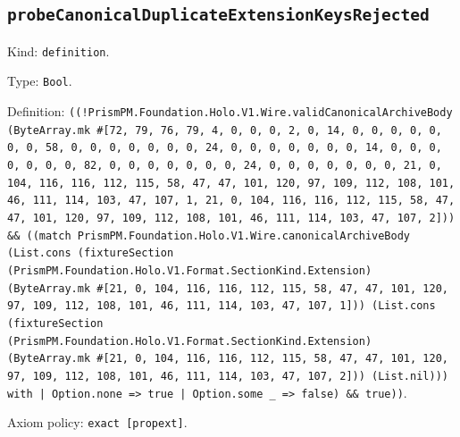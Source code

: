 \documentclass[11pt]{article}
\begin{document}
\subsection*{\texttt{probeCanonicalDuplicateExtensionKeysRejected}}
\noindent Kind: \texttt{definition}.\par
\noindent Type: \texttt{Bool}.\par
\noindent Definition: \texttt{((!PrismPM.Foundation.Holo.V1.Wire.validCanonicalArchiveBody (ByteArray.mk \#[72, 79, 76, 79, 4, 0, 0, 0, 2, 0, 14, 0, 0, 0, 0, 0, 0, 0, 58, 0, 0, 0, 0, 0, 0, 0, 24, 0, 0, 0, 0, 0, 0, 0, 14, 0, 0, 0, 0, 0, 0, 0, 82, 0, 0, 0, 0, 0, 0, 0, 24, 0, 0, 0, 0, 0, 0, 0, 21, 0, 104, 116, 116, 112, 115, 58, 47, 47, 101, 120, 97, 109, 112, 108, 101, 46, 111, 114, 103, 47, 107, 1, 21, 0, 104, 116, 116, 112, 115, 58, 47, 47, 101, 120, 97, 109, 112, 108, 101, 46, 111, 114, 103, 47, 107, 2])) \&\& ((match PrismPM.Foundation.Holo.V1.Wire.canonicalArchiveBody (List.cons (fixtureSection (PrismPM.Foundation.Holo.V1.Format.SectionKind.Extension) (ByteArray.mk \#[21, 0, 104, 116, 116, 112, 115, 58, 47, 47, 101, 120, 97, 109, 112, 108, 101, 46, 111, 114, 103, 47, 107, 1])) (List.cons (fixtureSection (PrismPM.Foundation.Holo.V1.Format.SectionKind.Extension) (ByteArray.mk \#[21, 0, 104, 116, 116, 112, 115, 58, 47, 47, 101, 120, 97, 109, 112, 108, 101, 46, 111, 114, 103, 47, 107, 2])) (List.nil))) with | Option.none => true | Option.some \_ => false) \&\& true))}.\par
\noindent Axiom policy: \texttt{exact [propext]}.\par
\end{document}
